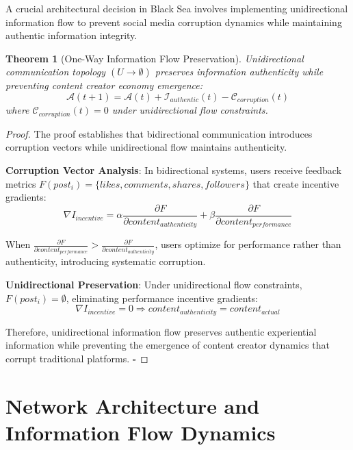 \documentclass[12pt,a4paper]{article}
\newtheorem{theorem}{Theorem}
\begin{document}
A crucial architectural decision in Black Sea involves implementing unidirectional information flow to prevent social media corruption dynamics while maintaining authentic information integrity.

\begin{theorem}[One-Way Information Flow Preservation]
Unidirectional communication topology $(U \rightarrow \emptyset)$ preserves information authenticity while preventing content creator economy emergence:
\begin{equation}
\mathcal{A}(t+1) = \mathcal{A}(t) + \mathcal{I}_{authentic}(t) - \mathcal{C}_{corruption}(t)
\end{equation}
where $\mathcal{C}_{corruption}(t) = 0$ under unidirectional flow constraints.
\end{theorem}

\begin{proof}
The proof establishes that bidirectional communication introduces corruption vectors while unidirectional flow maintains authenticity.

\textbf{Corruption Vector Analysis}:
In bidirectional systems, users receive feedback metrics $F(post_i) = \{likes, comments, shares, followers\}$ that create incentive gradients:
\begin{equation}
\nabla I_{incentive} = \alpha \frac{\partial F}{\partial content_{authenticity}} + \beta \frac{\partial F}{\partial content_{performance}}
\end{equation}

When $\frac{\partial F}{\partial content_{performance}} > \frac{\partial F}{\partial content_{authenticity}}$, users optimize for performance rather than authenticity, introducing systematic corruption.

\textbf{Unidirectional Preservation}:
Under unidirectional flow constraints, $F(post_i) = \emptyset$, eliminating performance incentive gradients:
\begin{equation}
\nabla I_{incentive} = 0 \Rightarrow content_{authenticity} = content_{actual}
\end{equation}

Therefore, unidirectional information flow preserves authentic experiential information while preventing the emergence of content creator dynamics that corrupt traditional platforms. $\square$
\end{proof}

\section{Network Architecture and Information Flow Dynamics}
\end{document}

